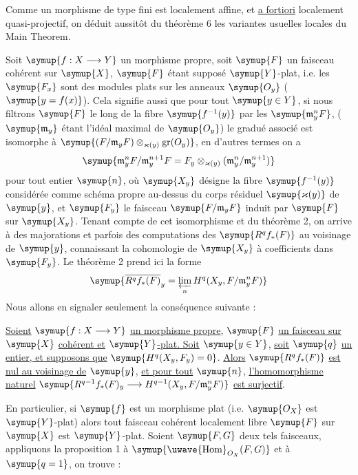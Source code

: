 Comme un morphisme de type fini est localement affine, et
\uline{a fortiori} localement quasi-projectif, on déduit aussitôt du théorème
6 les variantes usuelles locales du Main Theorem.


Soit $\symup{f:X\longrightarrow Y}$ un morphisme propre, soit $\symup{F}$ un faisceau cohérent
sur $\symup{X}$,
$\symup{F}$ étant supposé $\symup{Y}$-plat, i.e. les $\symup{F_x}$ sont des modules plats
sur les anneaux $\symup{O_y}$ ($\symup{y=f(x)}$). Cela signifie aussi que pour tout
$\symup{y\in Y}$, si nous filtrons $\symup{F}$ le long de la fibre $\symup{f^{-1}(y)}$ par les
$\symup{\mathfrak m_y^nF}$, ($\symup{\mathfrak m_y}$ étant l'idéal maximal de $\symup{O_y}$) le
gradué associé est isomorphe à
$\symup{(F/\mathfrak m_yF)\otimes_{\varkappa(y)}\operatorname{gr}(O_y)}$, en d'autres
termes on a
\[
  \symup{\mathfrak m_y^nF/\mathfrak m_y^{n+1}F
  =F_y\otimes_{\varkappa(y)}
  (\mathfrak m_y^n/\mathfrak m_y^{n+1})}
\]
pour tout entier $\symup{n}$, où $\symup{X_y}$ désigne la fibre $\symup{f^{-1}(y)}$ considérée comme
schéma propre au-dessus du corps résiduel $\symup{\varkappa(y)}$ de $\symup{y}$, et $\symup{F_y}$ le
faisceau $\symup{F/\mathfrak m_yF}$ induit par $\symup{F}$ sur $\symup{X_y}$. Tenant compte de cet
isomorphisme et du théorème 2, on arrive à des majorations et parfois des
computations des $\symup{R^qf_*(F)}$ au voisinage de $\symup{y}$, connaissant la cohomologie de
$\symup{X_y}$ à coefficients dans $\symup{F_y}$. Le théorème 2 prend ici la forme
\[
  \symup{\overline{R^qf_*(F)}_y
  =\varprojlim\limits_n H^q(X_y,F/\mathfrak m_y^nF)}
\]
Nous allons en signaler seulement la conséquence suivante :

 \uline{Soient} $\symup{f:X\longrightarrow Y}$ \uline{un morphisme propre},
$\symup{F}$ \uline{un faisceau sur} $\symup{X}$ \uline{cohérent et} $\symup{Y}$\uline{-plat. Soit} $\symup{y\in Y}$, \uline{soit} $\symup{q}$ \uline{un
entier, et supposons que} $\symup{H^q(X_y,F_y)=0}$. \uline{Alors} $\symup{R^qf_*(F)}$ \uline{est nul au
voisinage de} $\symup{y}$, \uline{et pour tout} $\symup{n}$, \uline{l'homomorphisme naturel}
$\symup{R^{q-1}f_*(F)_y\longrightarrow H^{q-1}(X_y,F/\mathfrak m_y^nF)}$
\uline{est surjectif}.

En particulier, si $\symup{f}$ est un morphisme plat (i.e. $\symup{O_X}$ est $\symup{Y}$-plat)
alors tout faisceau cohérent localement libre $\symup{F}$ sur $\symup{X}$ est $\symup{Y}$-plat. Soient
$\symup{F,G}$ deux tels faisceaux, appliquons la proposition 1 à
$\symup{\mathop{\text{\uwave{Hom}}}\nolimits_{O_X}(F,G)}$ et à $\symup{q=1}$, on trouve :

